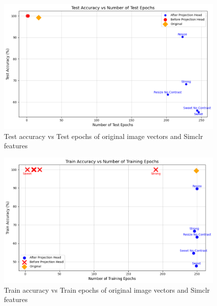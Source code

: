 \begin{table}[H]
    \centering
    \caption{Classification performance metrics for original image vectors using cross-validation with 10 k folds}
    \label{tab:original_results}
\end{table}
          \begin{figure}[H]
            \centering
            \includegraphics[scale=0.5]{figures/test_class.png} 
            \caption{Test accuracy vs Test epochs of original image vectors and Simclr features}
            \label{fig:test}
          \end{figure}

          \begin{figure}[H]
            \centering
            \includegraphics[scale=0.5]{figures/train_class.png} 
            \caption{Train accuracy vs Train epochs of original image vectors and Simclr features }
            \label{fig:train}
          \end{figure}
